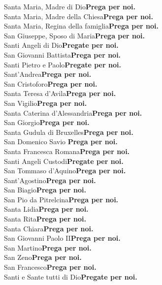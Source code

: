 \documentclass[10pt,b6paper,usenames,twoside]{article}
\begin{document}
\noindent Santa Maria, Madre di Dio\hfill\textbf{Prega per noi.} \\ 
Santa Maria, Madre della Chiesa\hfill\textbf{Prega per noi.} \\ 
Santa Maria, Regina della famiglia\hfill\textbf{Prega per noi.} \\ 
San Giuseppe, Sposo di Maria\hfill\textbf{Prega per noi.} \\ 
Santi Angeli di Dio\hfill\textbf{Pregate per noi.} \\ 
San Giovanni Battista\hfill\textbf{Prega per noi.} \\ 
Santi Pietro e Paolo\hfill\textbf{Pregate per noi.} \\ 
Sant'Andrea\hfill\textbf{Prega per noi.} \\ 
San Cristoforo\hfill\textbf{Prega per noi.} \\ 
Santa Teresa d’Avila\hfill\textbf{Prega per noi.} \\ 
San Vigilio\hfill\textbf{Prega per noi.} \\ 
Santa Caterina d’Alessandria\hfill\textbf{Prega per noi.} \\ 
San Giorgio\hfill\textbf{Prega per noi.} \\ 
Santa Gudula di Bruxelles\hfill\textbf{Prega per noi.} \\ 
San Domenico Savio \hfill\textbf{Prega per noi.} \\
Santa Francesca Romana\hfill\textbf{Prega per noi.} \\ 
Santi Angeli Custodi\hfill\textbf{Pregate per noi.} \\ 
San Tommaso d’Aquino\hfill\textbf{Prega per noi.} \\ 
Sant’Agostino\hfill\textbf{Prega per noi.} \\ 
San Biagio\hfill\textbf{Prega per noi.} \\ 
San Pio da Pitrelcina\hfill\textbf{Prega per noi.} \\ 
Santa Lidia\hfill\textbf{Prega per noi.} \\ 
Santa Rita\hfill\textbf{Prega per noi.} \\ 
Santa Chiara\hfill\textbf{Prega per noi.} \\ 
San Giovanni Paolo II\hfill\textbf{Prega per noi.} \\ 
San Martino\hfill\textbf{Prega per noi.} \\ 
San Zeno\hfill\textbf{Prega per noi.} \\ 
San Francesco\hfill\textbf{Prega per noi.} \\ 
Santi e Sante tutti di Dio\hfill\textbf{Pregate per noi.} \\ 
\end{document}
